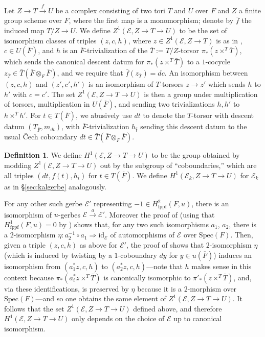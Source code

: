 \documentclass{amsart}
\theoremstyle{definition}
\newtheorem{definition}[result]{Definition}
\theoremstyle{remark}
\newcommand\Spec{\mathrm{Spec}}
\newcommand{\ov}{\overline}
\begin{document}
Let $Z \to T \xrightarrow{f} U$ be a complex consisting of two tori $T$ and $U$ over $F$ and $Z$ a finite group scheme over $F$, where the first map is a monomorphism; denote by $\bar{f}$ the induced map $T/Z \to U$. We define $Z^{1}(\mathcal{E},Z \to T \to U)$ to be the set of isomorphism classes of triples $(z,c,h)$, where $z \in Z^{1}(\mathcal{E}, Z \to T)$ is as in \cite[\S 2.3]{Dillery1}, $c \in U(\ov{F})$, and $h$ is an $\ov{F}$-trivialization of the $\bar{T}:=T/Z$-torsor $\pi_{*}(z\times^{T} \bar{T})$, which sends the canonical descent datum for $\pi_{*}(z\times^{T} \bar{T})$ to a $1$-cocycle $z_{\bar{T}} \in \bar{T}(\ov{F} \otimes_{F} \ov{F})$, and we require that $\bar{f}(z_{\bar{T}}) =dc$. An isomorphism between $(z,c,h)$ and $(z',c',h')$ is an isomorphism of $T$-torsors $z \to z'$ which sends $h$ to $h'$ with $c=c'$. The set $Z^{1}(\mathcal{E}, Z \to T \to U)$ is then a group under multiplication of torsors, multiplication in $U(\ov{F})$, and sending two trivializations $h,h'$ to $h \times^{\bar{T}} h'$. For $t \in T(\ov{F})$, we abusively use $dt$ to denote the $T$-torsor with descent datum $(T_{\ov{F}}, m_{dt})$, with $\ov{F}$-trivialization $h_{\bar{t}}$ sending this descent datum to the usual \v{C}ech coboundary $d\bar{t} \in \bar{T}(\ov{F} \otimes_{F} \ov{F})$.

\begin{definition}\label{def:mainH1}
    We define $H^{1}(\mathcal{E}, Z \to T \to U)$ to be the group obtained by modding $Z^{1}(\mathcal{E},Z \to T \to U)$ out by the subgroup of ``coboundaries,'' which are all triples $(dt, f(t), h_{\bar{t}})$ for $t \in T(\ov{F})$. We define $H^{1}(\mathcal{E}_{k}, Z \to T \to U)$ for $\mathcal{E}_{k}$ as in \S \ref{sec:kalgerbe} analogously.
\end{definition}

For any other such gerbe $\mathcal{E}'$ representing $-1 \in H^{2}_{\text{fppf}}(F,u)$, there is an isomorphism of $u$-gerbes $\mathcal{E} \xrightarrow{a} \mathcal{E}'$. Moreover the proof of \cite[Lemma 2.56]{Dillery1} (using that $H^{1}_{\text{fppf}}(F,u)=0$ by \cite[Theorem 3.4]{Dillery1}) shows that, for any two such isomorphisms $a_{1}$, $a_{2}$, there is a $2$-isomorphism $\eta \colon a_{2}^{-1} \circ a_{1} \Rightarrow \text{id}_{\mathcal{E}}$ of automorphisms of $\mathcal{E}$ over $\Spec(F)$. Then, given a triple $(z,c,h)$ as above for $\mathcal{E}'$, the proof of \cite[Lemma 2.56]{Dillery1} shows that $2$-isomorphism $\eta$ (which is induced by twisting by a $1$-coboundary $dy$ for $y \in u(\ov{F})$) induces an isomorphism from $(a_{1}^{*}z,c,h)$ to $(a_{2}^{*}z,c,h)$---note that $h$ makes sense in this context because $\pi_{*}(a_{i}^{*}z \times^{T} \bar{T})$ is canonically isomorphic to $\pi'_{*}(z \times^{T} \bar{T})$, and, via these identifications, is preserved by $\eta$ because it is a $2$-morphism over $\Spec(F)$---and so one obtains the same element of $Z^{1}(\mathcal{E}, Z \to T \to U)$. It follows that the set $Z^{1}(\mathcal{E}, Z \to T \to U)$ defined above, and therefore $H^{1}(\mathcal{E}, Z \to T \to U)$ only depends on the choice of $\mathcal{E}$ up to canonical isomorphism.
\end{document}
